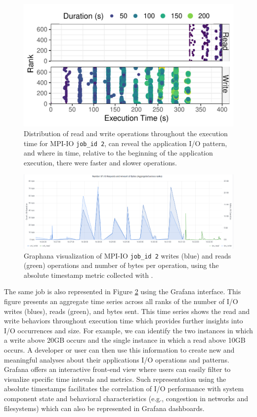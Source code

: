 \begin{figure}
	\centering
	\includegraphics[width=\linewidth]{figs/255653_mpi_io_luster_no_coll_execution2.pdf}
	\caption{Distribution of read and write operations
          throughout the execution time for MPI-IO \texttt{job\_id 2},
          can reveal the application I/O pattern, and where in time, relative to the beginning
of the application execution,
          there were faster and slower operations.}
	\label{f:mpi_io}
\end{figure}
\begin{figure}
	\centering
	\includegraphics[width=\textwidth]{figs/255653_mpi_io_luster_no_coll.pdf}
	\caption{Graphana visualization of MPI-IO \texttt{job\_id 2}
          writes (blue) and reads (green) operations and number of bytes per
          operation, using the absolute timestamp metric collected
	  with \Darshan{}.}
	  \label{f:mpi_io_grafana}
\end{figure}

The same job is also represented in Figure \ref{f:mpi_io_grafana}
using the Grafana interface. This figure presents an aggregate time
series across all ranks of the number of I/O
writes (blues), reads (green), and bytes sent.
This time series shows the read and write behaviors throughout execution 
time which provides further insights into I/O occurrences and size. For 
example, we can identify the two instances in which a write above 20GB 
occurs and the single instance in which a read above 10GB occurs. A developer 
or user can then use this information to create new and meaningful analyses 
about their applications I/O operations and patterns. Grafana offers an 
interactive front-end view where users can easily filter to visualize 
specific time intevals and metrics. Such representation using the absolute timestamps
facilitates the correlation of I/O performance with system component state
and behavioral characteristics (e.g., congestion in networks and filesystems)
which can also be represented in Grafana dashboards.


